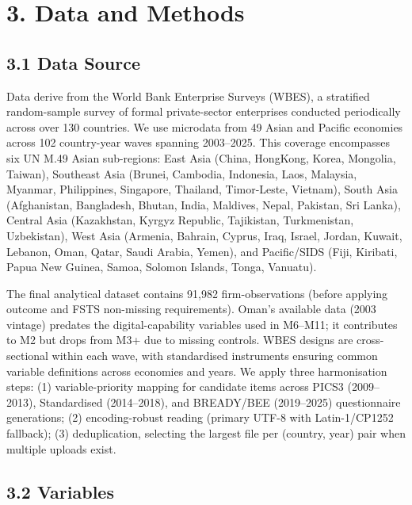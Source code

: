 \documentclass[
  12pt]{article}
\begin{document}
\hypertarget{data-and-methods}{%
\section{3. Data and Methods}\label{data-and-methods}}

\hypertarget{data-source}{%
\subsection{3.1 Data Source}\label{data-source}}

Data derive from the World Bank Enterprise Surveys (WBES), a stratified
random-sample survey of formal private-sector enterprises conducted
periodically across over 130 countries. We use microdata from 49 Asian
and Pacific economies across 102 country-year waves spanning 2003--2025.
This coverage encompasses six UN M.49 Asian sub-regions: East Asia
(China, HongKong, Korea, Mongolia, Taiwan), Southeast Asia (Brunei,
Cambodia, Indonesia, Laos, Malaysia, Myanmar, Philippines, Singapore,
Thailand, Timor-Leste, Vietnam), South Asia (Afghanistan, Bangladesh,
Bhutan, India, Maldives, Nepal, Pakistan, Sri Lanka), Central Asia
(Kazakhstan, Kyrgyz Republic, Tajikistan, Turkmenistan, Uzbekistan),
West Asia (Armenia, Bahrain, Cyprus, Iraq, Israel, Jordan, Kuwait,
Lebanon, Oman, Qatar, Saudi Arabia, Yemen), and Pacific/SIDS (Fiji,
Kiribati, Papua New Guinea, Samoa, Solomon Islands, Tonga, Vanuatu).

The final analytical dataset contains 91,982 firm-observations (before
applying outcome and FSTS non-missing requirements). Oman's available
data (2003 vintage) predates the digital-capability variables used in
M6--M11; it contributes to M2 but drops from M3+ due to missing
controls. WBES designs are cross-sectional within each wave, with
standardised instruments ensuring common variable definitions across
economies and years. We apply three harmonisation steps: (1)
variable-priority mapping for candidate items across PICS3 (2009--2013),
Standardised (2014--2018), and BREADY/BEE (2019--2025) questionnaire
generations; (2) encoding-robust reading (primary UTF-8 with
Latin-1/CP1252 fallback); (3) deduplication, selecting the largest file
per (country, year) pair when multiple uploads exist.

\hypertarget{variables}{%
\subsection{3.2 Variables}\label{variables}}
\end{document}
